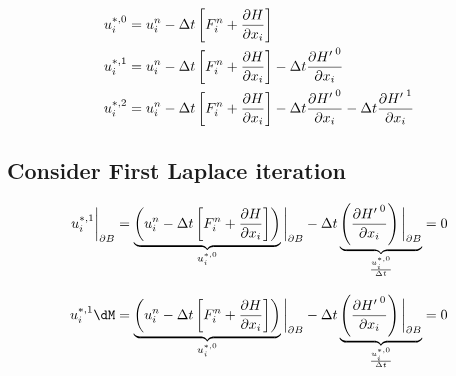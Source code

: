 \newpage


\begin{align}
u_i^{*,{0}} & = u_i^n - \Delta t \left[ F_i^n + \frac{\partial {H}}{\partial x_i} \right]     \nonumber \\
u_i^{*,{1}} & = u_i^n - \Delta t \left[ F_i^n + \frac{\partial {H}}{\partial x_i} \right] - \Delta t \frac{\partial {{H'\,}}^{0}}{\partial x_i}      \nonumber \\
u_i^{*,{2}} & = u_i^n - \Delta t \left[ F_i^n + \frac{\partial {H}}{\partial x_i} \right] - \Delta t  \frac{\partial {{H'\,}}^{0}}{\partial x_i} - \Delta t  \frac{\partial {{H'\,}}^{1}}{\partial x_i}     \nonumber \\
 \end{align}

\subsection{Consider First Laplace iteration}

\begin{align}  
%
\UIK{1}\dB  &=  \underbrace{\left(u_i^n   - \Delta t \left[ F_i^n + \frac{\pH}{\pxi}\right] \right) }_{u_i^{*,0}} \dB 
                                          - \Delta t \underbrace{\left( \frac{\pHSK{0}}{\pxi}\right)\dB}_{\frac{u_i^{*,0}}{\Delta t}} = 0 \nonumber \\[2ex]
%
\UIK{1}\dM  &=  \underbrace{\left(u_i^n -   \Delta t \left[ F_i^n + \frac{\pH}{\pxi}\right] \right) }_{u_i^{*,0}} \dB 
                                        -   \Delta t \underbrace{\left( \frac{\pHSK{0}}{\pxi}\right)\dB}_{\frac{u_i^{*,0}}{\Delta t}} = 0 \nonumber 
%
\end{align}





